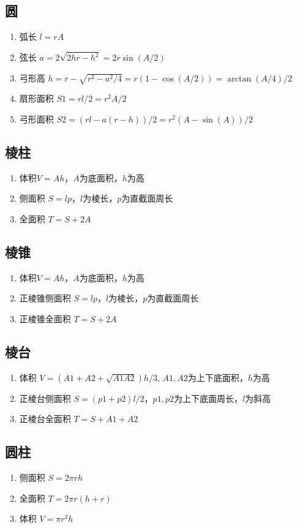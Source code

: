 \subsection*{圆}
	\begin{enumerate}
		\item 弧长 $l=rA$
		\item 弦长 $a=2\sqrt{2hr-h^2}=2r\sin(A/2)$
		\item 弓形高 $h=r-\sqrt{r^2-a^2/4}=r(1-\cos(A/2))=\arctan(A/4)/2$
		\item 扇形面积 $S1=rl/2=r^2A/2$
		\item 弓形面积 $S2=(rl-a(r-h))/2=r^2(A-\sin(A))/2$
	\end{enumerate}
	
\subsection*{棱柱}
	\begin{enumerate}
		\item 体积$V=Ah$，$A$为底面积，$h$为高
		\item 侧面积 $S=lp$，$l$为棱长，$p$为直截面周长
		\item 全面积 $T=S+2A$
	\end{enumerate}

\subsection*{棱锥}
	\begin{enumerate}
		\item 体积$V=Ah$，$A$为底面积，$h$为高
		\item 正棱锥侧面积 $S=lp$，$l$为棱长，$p$为直截面周长
		\item 正棱锥全面积 $T=S+2A$
	\end{enumerate}

\subsection*{棱台}
	\begin{enumerate}
		\item 体积 $V=(A1+A2+\sqrt{A1A2})h/3$, $A1,A2$为上下底面积，$h$为高
		\item 正棱台侧面积 $S=(p1+p2)l/2$，$p1,p2$为上下底面周长，$l$为斜高
		\item 正棱台全面积 $T=S+A1+A2$
	\end{enumerate}

\subsection*{圆柱}
	\begin{enumerate}
		\item 侧面积 $S=2\pi rh$
		\item 全面积 $T=2\pi r(h+r)$
		\item 体积 $V=\pi r^2h$
	\end{enumerate}

